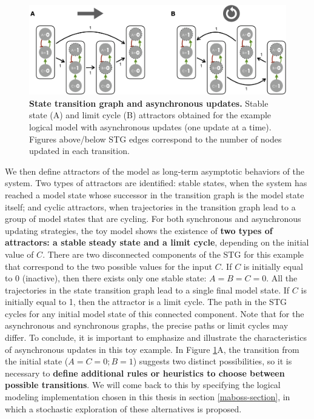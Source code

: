 \documentclass[a4paper,12pt,twoside,onecolumn,openright,final,oldfontcommands]{memoir}
\begin{document}
\begin{figure}

{\centering \includegraphics[width=0.9\linewidth]{fig/asynchronous} 

}

\caption[State transition graph and asynchronous updates]{\textbf{State transition graph and
asynchronous updates.} Stable state (A) and limit cycle (B) attractors
obtained for the example logical model with asynchronous updates (one
update at a time). Figures above/below STG edges correspond to the
number of nodes updated in each transition.}\label{fig:asynchronous}
\end{figure}







We then define attractors of the model as long-term asymptotic behaviors
of the system. Two types of attractors are identified: stable states,
when the system has reached a model state whose successor in the
transition graph is the model state itself; and cyclic attractors, when
trajectories in the transition graph lead to a group of model states
that are cycling. For both synchronous and asynchronous updating
strategies, the toy model shows the existence of \textbf{two types of
attractors: a stable steady state and a limit cycle}, depending on the
initial value of \(C\). There are two disconnected components of the STG
for this example that correspond to the two possible values for the
input \(C\). If \(C\) is initially equal to 0 (inactive), then there
exists only one stable state: \(A=B=C=0\). All the trajectories in the
state transition graph lead to a single final model state. If \(C\) is
initially equal to 1, then the attractor is a limit cycle. The path in
the STG cycles for any initial model state of this connected component.
Note that for the asynchronous and synchronous graphs, the precise paths
or limit cycles may differ. To conclude, it is important to emphasize
and illustrate the characteristics of asynchronous updates in this toy
example. In Figure \ref{fig:asynchronous}A, the transition from the
initial state (\(A=C=0;B=1\)) suggests two distinct possibilities, so it
is necessary to \textbf{define additional rules or heuristics to choose
between possible transitions}. We will come back to this by specifying
the logical modeling implementation chosen in this thesis in section
\ref{maboss-section}, in which a stochastic exploration of these
alternatives is proposed.
\end{document}
